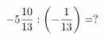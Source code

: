 \documentclass[preview]{standalone}
\begin{document}
\begin{align*}
-5 { 10 \over 13 }  :  \left( - { 1 \over 13 } \right) =  ?
\end{align*}
\end{document}
